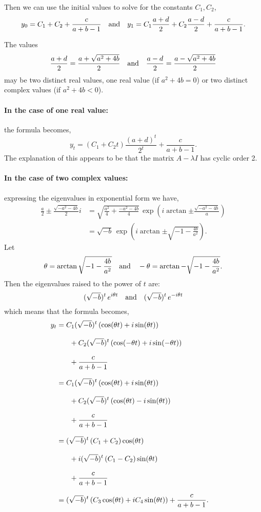 \documentclass[MathsNotesBase.tex]{subfiles}
\begin{document}
{		Then we can use the initial values to solve for the constants ${ C_1, C_2 }$,
		\[ y_0 = C_1 + C_2 + \frac{c}{a+b-1} \hspace{10pt}\text{and}\hspace{10pt} y_1 = C_1 \frac{a+d}{2} + C_2 \frac{a-d}{2} + \frac{c}{a+b-1}. \]
		
		The values 
		\[ \frac{a+d}{2} = \frac{a + \sqrt{a^2 + 4b}}{2} \hspace{10pt}\text{and}\hspace{10pt} \frac{a-d}{2} = \frac{a - \sqrt{a^2 + 4b}}{2} \]
		may be two distinct real values, one real value (if ${ a^2 + 4b = 0 }$) or two distinct complex values (if ${ a^2 + 4b < 0 }$).
		
		\paragraph{In the case of one real value:} the formula becomes,
		\[ y_t = (C_1 + C_2 t) \frac{(a+d)^t}{2^t} + \frac{c}{a+b-1}. \]
		The explanation of this appears to be that the matrix ${ A - \lambda I }$ has cyclic order 2. 
		
		\paragraph{In the case of two complex values:} expressing the eigenvalues in exponential form we have,
		\begin{align*}
		\frac{a}{2} \pm \frac{\sqrt{-a^2 - 4b}}{2} i &= \sqrt{ \frac{a^2}{4} + \frac{-a^2 - 4b}{4} }\, \exp\left(i\arctan{\pm\frac{\sqrt{-a^2 - 4b}}{a}}\right) \\[4pt]
		&= \sqrt{-b}\, \exp\left(i\arctan{\pm\sqrt{-1 - \frac{4b}{a^2}}}\right).
		\end{align*}
		Let 
		\[ \theta = \arctan{\sqrt{-1 - \frac{4b}{a^2}}} \hspace{10pt}\text{and}\hspace{10pt} -\theta = \arctan{-\sqrt{-1 - \frac{4b}{a^2}}}. \]
		Then the eigenvalues raised to the power of $t$ are:
		\[ (\sqrt{-b})^t\, e^{i \theta t} \hspace{10pt}\text{and}\hspace{10pt} (\sqrt{-b})^t\, e^{-i \theta t} \]
		which means that the formula becomes,
		\begin{align*}
		y_t &= C_1(\sqrt{-b})^t\, (\cos(\theta t) + i \sin(\theta t))\\[8pt]
			&\hspace{18pt} +  C_2(\sqrt{-b})^t\, (\cos(-\theta t) + i \sin(-\theta t)) \\[8pt]
			&\hspace{18pt} +  \frac{c}{a+b-1} \\[8pt]
		&= C_1(\sqrt{-b})^t\, (\cos(\theta t) + i \sin(\theta t))\\[8pt]
			&\hspace{18pt} +  C_2(\sqrt{-b})^t\, (\cos(\theta t) - i \sin(\theta t)) \\[8pt]
			&\hspace{18pt} +  \frac{c}{a+b-1} &\text{\scriptsize{}} \\[8pt]
		&= (\sqrt{-b})^t\, (C_1 + C_2)\cos(\theta t) \\[8pt]
			&\hspace{18pt} + i (\sqrt{-b})^t\, (C_1 - C_2) \sin(\theta t) \\[8pt]
			&\hspace{18pt} +  \frac{c}{a+b-1} &\text{\scriptsize{}} \\[8pt]
		&= (\sqrt{-b})^t\, (C_3\cos(\theta t) + i C_4 \sin(\theta t)) +  \frac{c}{a+b-1}.
		\end{align*}
		
}
\end{document}
